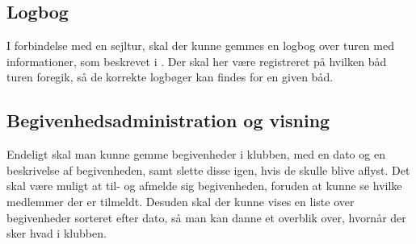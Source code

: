 \subsection{Logbog}

I forbindelse med en sejltur, skal der kunne gemmes en logbog over turen med informationer, som beskrevet i .
Der skal her være registreret på hvilken båd turen foregik, så de korrekte logbøger kan findes for en given båd.

\subsection{Begivenhedsadministration og visning} 

Endeligt skal man kunne gemme begivenheder i klubben, med en dato og en beskrivelse af begivenheden, samt slette disse igen, hvis de skulle blive aflyst. 
Det skal være muligt at til- og afmelde sig begivenheden, foruden at kunne se hvilke medlemmer der er tilmeldt.
Desuden skal der kunne vises en liste over begivenheder sorteret efter dato, så man kan danne et overblik over, hvornår der sker hvad i klubben.
